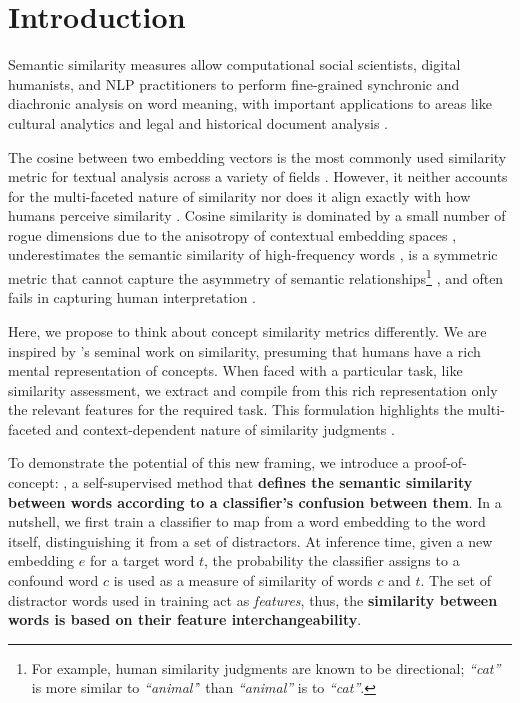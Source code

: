 \section{Introduction}
\label{sec:intro}

Semantic similarity measures allow computational social scientists, digital humanists, and NLP practitioners to perform fine-grained synchronic and diachronic analysis on word meaning, with important applications to areas like cultural analytics and legal and historical document analysis \cite{bhattacharya2020methods, rios2012dissimilarity}. 

The cosine between two embedding vectors is the most commonly used similarity metric for textual analysis across a variety of fields 
\cite{johri-etal-2011-study, caliskan2017semantics, manzini-etal-2019-black, martinc-etal-2020-leveraging}. However, it neither accounts for the multi-faceted nature of similarity  \cite[inter alia]{tversky1977features, ettinger2016evaluating, zhou2022problems} nor does it align exactly with how humans perceive similarity \cite{nematzadeh2017evaluating}. Cosine similarity is dominated by a small number of rogue dimensions due to the anisotropy of contextual embedding spaces \cite{timkey2021all, ethayarajh2019contextual}, underestimates the semantic similarity of high-frequency words \citep{zhou2022problems}, is a symmetric metric that cannot capture the asymmetry of semantic relationships\footnote{For example, human similarity judgments are known to be directional; \textit{``cat''} is more similar to \textit{``animal'}' than \textit{``animal''} is to \textit{``cat''}.} \citep{vilnis2014word}, and often fails in capturing human interpretation \cite{sitikhu2019comparison}. 

Here, we propose to think about concept similarity metrics differently. We are inspired by \citet{tversky1977features}'s seminal work on similarity, presuming that humans have a rich mental representation of concepts. When faced with a particular task, like similarity assessment, we extract and compile from this rich representation only the relevant features for the required task. This formulation highlights the multi-faceted and context-dependent nature of similarity judgments \cite{evers2014revisiting}.
 
To demonstrate the potential of this new framing, we introduce a proof-of-concept: \wc, a self-supervised method that {\bf defines the semantic similarity between words according to a classifier's confusion between them}. In a nutshell, we first train a classifier to map from a word embedding to the word itself, distinguishing it from a set of distractors. At inference time, given a new embedding $e$ for a target word $t$, the probability the classifier assigns to a confound word $c$ is used as a measure of similarity of words $c$ and $t$. The set of distractor words used in training act as \textit{features}, thus, the \textbf{similarity between words is based on their feature interchangeability}. 

